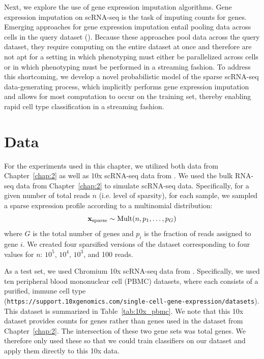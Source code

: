 Next, we explore the use of gene expression imputation algorithms. Gene expression imputation on scRNA-seq is the task of imputing counts for genes. Emerging approaches for gene expression imputation entail pooling data across cells in the query dataset (\citealp{Dijk2018, Huang2018, Li2018}).  Because these approaches pool data across the query dataset, they require computing on the entire dataset at once and therefore are not apt for a setting in which phenotyping must either be parallelized across cells or in which phenotyping must be performed in a streaming fashion. To address this shortcoming, we develop a novel probabilistic model of the sparse scRNA-seq data-generating process, which implicitly performs gene expression imputation and allows for most computation to occur on the training set, thereby enabling rapid cell type classification in a streaming fashion. 
 
\section{Data}\label{sec:sparse_data}

For the experiments used in this chapter, we utilized both data from Chapter~\ref{chap:2} as well as 10x scRNA-seq data from  \cite{Zhang2018}. We used the bulk RNA-seq data from Chapter~\ref{chap:2} to simulate scRNA-seq data. Specifically, for a given number of total reads $n$ (i.e. level of sparsity), for each sample, we sampled a sparse expression profile according to a multinomial distribution:
 $$\bold{x}_{\text{sparse}} \sim \text{Mult}(n, p_1, \dots, p_G)$$
 where $G$ is the total number of genes and $p_i$ is the fraction of reads assigned to gene $i$.  We created four sparsified versions of the dataset corresponding to four values for $n$: $10^5$, $10^4$, $10^3$, and 100 reads. 
 
 As a test set, we used Chromium 10x scRNA-seq data from \cite{Zhang2018}. Specifically, we used ten peripheral blood mononuclear cell (PBMC) datasets, where each consists of a purified, immune cell type\\(\texttt{https://support.10xgenomics.com/single-cell-gene-expression/datasets}). This dataset is summarized in Table~\ref{tab:10x_pbmc}.  We note that this 10x dataset provides counts for \NumTenXGenes{} genes rather than \GeneLevelFeatures{} genes used in the dataset from Chapter~\ref{chap:2}.  The intersection of these two gene sets was \NumTenXIntersection{} total genes.  We therefore only used these  \NumTenXIntersection{} so that we could train classifiers on our dataset and apply them directly to this 10x data.
 
